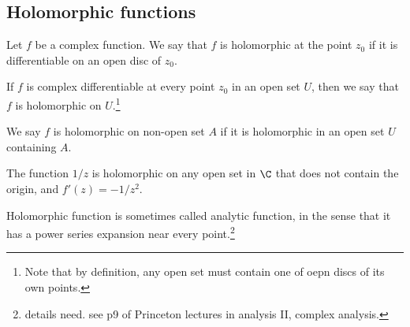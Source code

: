 
\subsection{Holomorphic functions}

\begin{definition}\label{def:holomorphic_function}%
Let $f$ be a complex function. We say that $f$ is holomorphic at the point $z_0$ if it is differentiable on an open disc of $z_0$.

If $f$ is complex differentiable at every point $z_0$ in an open set $U$, then we say that $f$ is holomorphic on $U$.\footnote{Note that by definition, any open set must contain one of oepn discs of its own points.}

We say $f$ is holomorphic on non-open set $A$ if it is holomorphic in an open set $U$ containing $A$.
\end{definition}

\begin{example}
The function $1/z$ is holomorphic on any open set in $\C$ that does not contain the origin, and $f'(z) = -1/z^2$.
\end{example}


\begin{remark}
Holomorphic function is sometimes called analytic function, in the sense that it has a power series expansion near every point.\footnote{details need. see p9 of Princeton lectures in analysis II, complex analysis.}
\end{remark}


